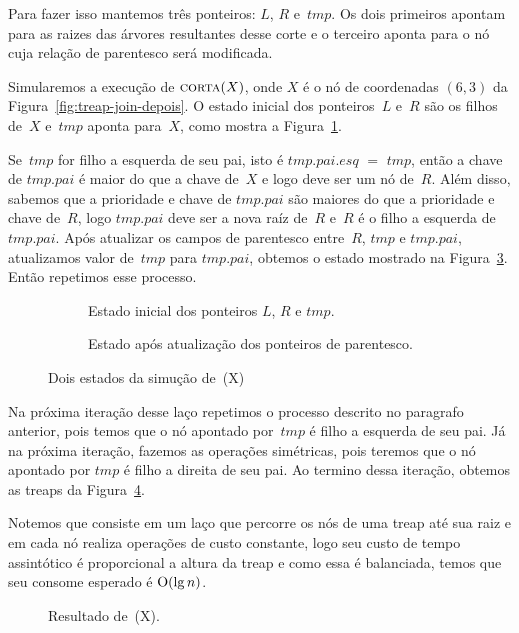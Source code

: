 Para fazer isso mantemos três ponteiros: $L$, $R$ e~$tmp$. 
Os dois primeiros apontam para as raizes das árvores resultantes desse corte e o terceiro aponta para o nó cuja relação de parentesco será modificada.

Simularemos a execução de $\text{\scshape corta}(X)$, onde $X$ é o nó de coordenadas $(6,3)$ da Figura~\ref{fig:treap-join-depois}.
O estado inicial dos ponteiros~$L$ e~$R$ são os filhos de~$X$ e~$tmp$ aponta para~$X$, como mostra a Figura~\ref{fig:treap-split-1}.

Se~$tmp$ for filho a esquerda de seu pai, isto é $tmp$.$pai$.$esq$ $=$ $tmp$, então a chave de $tmp$.$pai$ é maior do que a chave de~$X$ e logo deve ser um nó de~$R$.
Além disso, sabemos que a prioridade e chave de $tmp$.$pai$ são maiores do que a prioridade e chave de~$R$, logo $tmp$.$pai$ deve ser a nova raíz de~$R$ e~$R$ é o filho a esquerda de~$tmp$.$pai$.
Após atualizar os campos de parentesco entre~$R$, $tmp$ e $tmp$.$pai$, atualizamos valor de~$tmp$ para $tmp$.$pai$, obtemos o estado mostrado na Figura~\ref{fig:treap-split-2}.
Então repetimos esse processo. 


\begin{figure}[htb]
\begin{subfigure}{0.3\textwidth}

\caption{Estado inicial dos ponteiros $L$, $R$ e $tmp$.}
\label{fig:treap-split-1}
\end{subfigure}
\hspace{1cm}
\begin{subfigure}{0.3\textwidth}

\caption{Estado após atualização dos ponteiros de parentesco.}
\label{fig:treap-split-2}
\end{subfigure}
\caption{Dois estados da simução de~\treapSplit(X)}
\end{figure}

Na próxima iteração desse laço repetimos o processo descrito no paragrafo anterior, pois temos que o nó apontado por~$tmp$ é filho a esquerda de seu pai.
Já na próxima iteração, fazemos as operações simétricas, pois teremos que o nó apontado por $tmp$ é filho a direita de seu pai.
Ao termino dessa iteração, obtemos as treaps da Figura~\ref{fig:treap-split-final}.


Notemos que \treapSplit{} consiste em um laço que percorre os nós de uma treap até sua raiz e em cada nó realiza operações de custo constante, logo seu custo de tempo assintótico é proporcional a altura da treap e como essa é balanciada, temos que seu consome esperado é $\mathrm{O}(\lg n)$.




\begin{figure}[htb]
\centering

\caption{Resultado de~\treapSplit(X).}
\label{fig:treap-split-final}
\end{figure}
